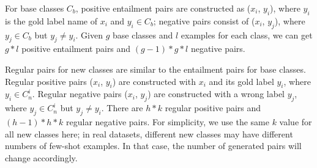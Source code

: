 \documentclass[11pt]{article}
\begin{document}


\iffalse
For base classes $C_b$, positive entailment pairs are constructed as ($x_i$, $y_i$), where $y_i$ is the gold label name of $x_i$ and $y_i\in C_b$; negative pairs consist of ($x_i$, $y_j$), where $y_j\in C_b$ but $y_j\neq y_i$.
Given $g$ base classes and $l$ examples for each class, we can get $g*l$ positive entailment pairs and $(g-1)*g*l$ negative pairs.

Regular pairs for new classes are similar to the entailment pairs for base classes. Regular positive pairs ($x_i$, $y_i$) are constructed with $x_i$ and its gold label $y_i$, where $y_i\in C_n^i$. Regular negative pairs ($x_i$, $y_j$) are constructed with a wrong label $y_j$, where $y_j\in C_n^i$ but $y_j \neq y_i$. There are $h*k$ regular positive pairs and $(h-1)*h*k$ regular negative pairs.
    For simplicity, we use the same $k$ value for all new classes here;
    in real datasets, different new classes may have different numbers of few-shot examples. In that case, the number of generated pairs will change accordingly.
    
\end{document}
